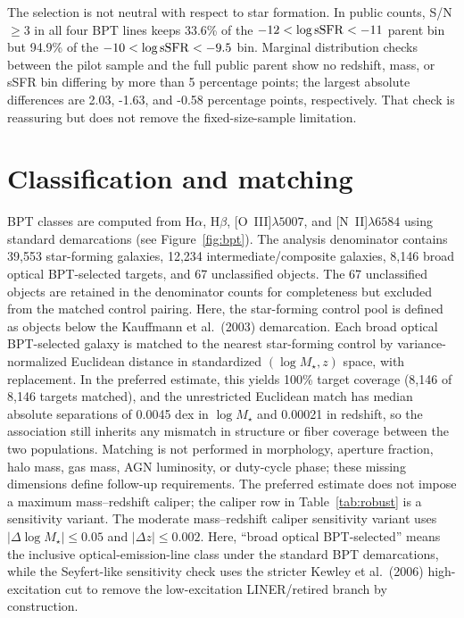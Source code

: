 \documentclass[twocolumn]{aastex631}
\begin{document}
The selection is not neutral with respect to star formation. In public counts, S/N$\geq3$ in all four BPT lines keeps 33.6\% of the $-12<\log {\rm sSFR}<-11$ parent bin but 94.9\% of the $-10<\log {\rm sSFR}<-9.5$ bin. Marginal distribution checks between the pilot sample and the full public parent show no redshift, mass, or sSFR bin differing by more than 5 percentage points; the largest absolute differences are 2.03, -1.63, and -0.58 percentage points, respectively. That check is reassuring but does not remove the fixed-size-sample limitation.

\section{Classification and matching}
BPT classes are computed from H$\alpha$, H$\beta$, [O~III]$\lambda5007$, and [N~II]$\lambda6584$ using standard demarcations \citep{baldwin1981,kewley2001,kauffmann2003bpt,kewley2006} (see Figure~\ref{fig:bpt}). The analysis denominator contains 39,553 star-forming galaxies, 12,234 intermediate/composite galaxies, 8,146 broad optical BPT-selected targets, and 67 unclassified objects. The 67 unclassified objects are retained in the denominator counts for completeness but excluded from the matched control pairing. Here, the star-forming control pool is defined as objects below the Kauffmann et al.\ (2003) demarcation. Each broad optical BPT-selected galaxy is matched to the nearest star-forming control by variance-normalized Euclidean distance in standardized $(\log M_\star,z)$ space, with replacement. In the preferred estimate, this yields 100\% target coverage (8,146 of 8,146 targets matched), and the unrestricted Euclidean match has median absolute separations of 0.0045 dex in $\log M_\star$ and 0.00021 in redshift, so the association still inherits any mismatch in structure or fiber coverage between the two populations. Matching is not performed in morphology, aperture fraction, halo mass, gas mass, AGN luminosity, or duty-cycle phase; these missing dimensions define follow-up requirements. The preferred estimate does not impose a maximum mass--redshift caliper; the caliper row in Table~\ref{tab:robust} is a sensitivity variant. The moderate mass--redshift caliper sensitivity variant uses $|\Delta\log M_\star|\leq0.05$ and $|\Delta z|\leq0.002$.
Here, ``broad optical BPT-selected'' means the inclusive optical-emission-line class under the standard BPT demarcations, while the Seyfert-like sensitivity check uses the stricter Kewley et al.\ (2006) high-excitation cut to remove the low-excitation LINER/retired branch by construction.
\end{document}
